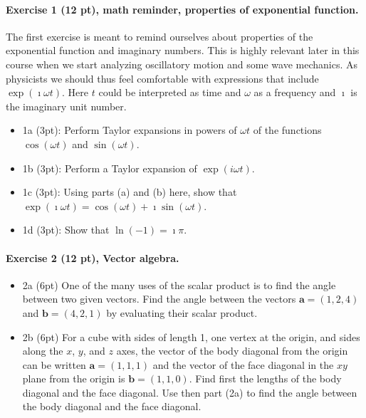 \documentclass[%
oneside,                 %
final,                   %
10pt]{article}
\begin{document}
\noindent
\paragraph{Exercise 1 (12 pt), math reminder, properties of exponential function.}
The first exercise is meant to remind ourselves about properties of
the exponential function and imaginary numbers. This is highly
relevant later in this course when we start analyzing oscillatory
motion and some wave mechanics. As physicists we should thus feel comfortable with expressions that
include $\exp{(\imath\omega t)}$. Here $t$ could be interpreted as time and $\omega$ as a frequency and $\imath$ is the imaginary unit number.

\begin{itemize}
\item 1a (3pt): Perform Taylor expansions in powers of $\omega t$ of the functions $\cos{(\omega t)}$ and $\sin{(\omega t)}$.

\item 1b (3pt): Perform a Taylor expansion of $\exp{(i\omega t)}$.

\item 1c (3pt): Using parts (a) and (b) here, show that $\exp{(\imath\omega t)}=\cos{(\omega t)}+\imath\sin{(\omega t)}$.

\item 1d (3pt): Show that $\ln{(−1)} = \imath\pi$.
\end{itemize}

\noindent
\paragraph{Exercise 2 (12 pt), Vector algebra.}
\begin{itemize}
\item 2a (6pt) One of the many uses of the scalar product is to find the angle between two given vectors. Find the angle between the vectors $\bm{a}=(1,2,4)$ and $\bm{b}=(4,2,1)$ by evaluating their scalar product.

\item 2b (6pt) For a cube with sides of length 1, one vertex at the origin, and sides along the $x$, $y$, and $z$ axes, the vector of the body diagonal from the origin can be written $\bm{a}=(1, 1, 1)$ and the vector of the face diagonal in the $xy$ plane from the origin is $\bm{b}=(1,1,0)$. Find first the lengths of the body diagonal and the face diagonal. Use then part (2a) to find the angle between the body diagonal and the face diagonal.
\end{itemize}
\end{document}
